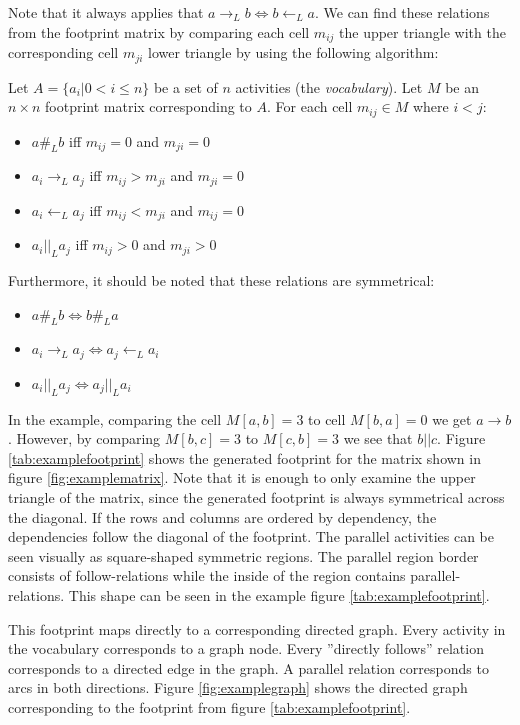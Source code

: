 Note that it always applies that $a \rightarrow_L b \Leftrightarrow b \leftarrow_L a$.
We can find these relations from the footprint matrix by comparing each cell $m_{ij}$ the upper triangle with the corresponding cell $m_{ji}$ lower triangle by using the following algorithm:

\begin{definition}
Let $A = \{ a_i | 0 < i \le n \}$ be a set of $n$ activities (the \emph{vocabulary}).
Let $M$ be an $n \times n$ footprint matrix corresponding to $A$.
For each cell $m_{ij} \in M$ where $i < j$:
\begin{itemize}
    \item $a \#_L b$ iff $m_{ij} = 0$ and $m_{ji} = 0$
    \item $a_i \rightarrow_L a_j$ iff $m_{ij} > m_{ji}$ and $m_{ji} = 0$
    \item $a_i \leftarrow_L a_j$ iff $m_{ij} < m_{ji}$ and $m_{ij} = 0$
    \item $a_i ||_L a_j$ iff $m_{ij} > 0$ and $m_{ji} > 0$
\end{itemize}
Furthermore, it should be noted that these relations are symmetrical:
\begin{itemize}
    \item $a \#_L b \Leftrightarrow b \#_L a$ 
    \item $a_i \rightarrow_L a_j \Leftrightarrow a_j \leftarrow_L a_i$
    \item $a_i ||_L a_j \Leftrightarrow a_j ||_L a_i$ 
\end{itemize}
\label{def:logrelations}
\end{definition}

In the example, comparing the cell $M[a,b] = 3$ to cell $M[b,a] = 0$ we get $a \rightarrow b$. 
However, by comparing $M[b,c] = 3$ to $M[c,b] = 3$ we see that $b || c$. 
Figure \ref{tab:examplefootprint} shows the generated footprint for the matrix shown in figure \ref{fig:examplematrix}.
Note that it is enough to only examine the upper triangle of the matrix, since the generated footprint is always symmetrical across the diagonal.
If the rows and columns are ordered by dependency, the dependencies follow the diagonal of the footprint.
The parallel activities can be seen visually as square-shaped symmetric regions.
The parallel region border consists of follow-relations while the inside of the region contains parallel-relations.
This shape can be seen in the example figure \ref{tab:examplefootprint}.

This footprint maps directly to a corresponding directed graph.
Every activity in the vocabulary corresponds to a graph node.
Every ''directly follows'' relation corresponds to a directed edge in the graph. A parallel relation corresponds to arcs in both directions.
Figure \ref{fig:examplegraph} shows the directed graph corresponding to the footprint from figure \ref{tab:examplefootprint}.

